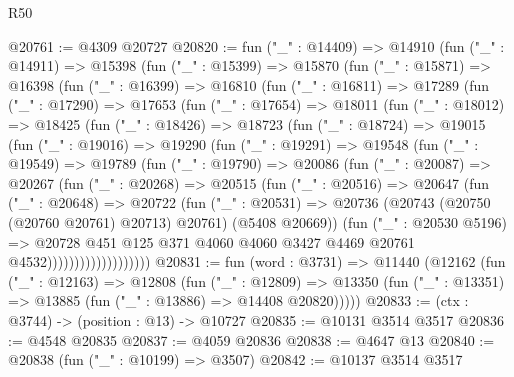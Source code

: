 \begin{lexlean}{R50}
\begin{coremodule}
@20761 := @4309 @20727
@20820 := fun ("_" : @14409) =>
  @14910
    (fun ("_" : @14911) =>
    @15398
      (fun ("_" : @15399) =>
      @15870
        (fun ("_" : @15871) =>
        @16398
          (fun ("_" : @16399) =>
          @16810
            (fun ("_" : @16811) =>
            @17289
              (fun ("_" : @17290) =>
              @17653
                (fun ("_" : @17654) =>
                @18011
                  (fun ("_" : @18012) =>
                  @18425
                    (fun ("_" : @18426) =>
                    @18723
                      (fun ("_" : @18724) =>
                      @19015
                        (fun ("_" : @19016) =>
                        @19290
                          (fun ("_" : @19291) =>
                          @19548
                            (fun ("_" : @19549) =>
                            @19789
                              (fun ("_" : @19790) =>
                              @20086
                                (fun ("_" : @20087) =>
                                @20267
                                  (fun ("_" : @20268) =>
                                  @20515
                                    (fun ("_" : @20516) =>
                                    @20647
                                      (fun ("_" : @20648) =>
                                      @20722
                                        (fun ("_" : @20531) =>
                                        @20736
                                          (@20743 (@20750 (@20760 @20761) @20713) @20761)
                                          (@5408 @20669))
                                        (fun ("_" : @20530 @5196) =>
                                        @20728
                                          @451
                                          @125
                                          @371
                                          @4060
                                          @4060
                                          @3427
                                          @4469
                                          @20761
                                          @4532)))))))))))))))))))
@20831 := fun (word : @3731) =>
  @11440
    (@12162
      (fun ("_" : @12163) =>
      @12808
        (fun ("_" : @12809) =>
        @13350 (fun ("_" : @13351) => @13885 (fun ("_" : @13886) => @14408 @20820)))))
@20833 := (ctx : @3744) -> (position : @13) -> @10727
@20835 := @10131 @3514 @3517
@20836 := @4548 @20835
@20837 := @4059 @20836
@20838 := @4647 @13
@20840 := @20838 (fun ("_" : @10199) => @3507)
@20842 := @10137 @3514 @3517

\end{coremodule}
\end{lexlean}
